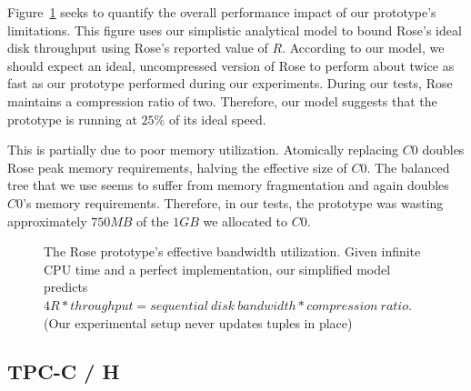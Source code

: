 \documentclass{vldb}
\newcommand{\rows}{Rose\xspace}
\newcommand{\rowss}{Rose's\xspace}
\begin{document}
Figure~\ref{fig:4R} seeks to quantify the overall performance
impact of our prototype's
limitations.  This figure uses our simplistic analytical model
to bound \rowss ideal disk throughput using \rowss
reported value of $R$.  According to our
model, we should expect an ideal, uncompressed version of \rows to
perform about twice as fast as our prototype performed during our experiments.  During our tests, \rows
maintains a compression ratio of two.  Therefore, our model suggests
that the prototype is running at $25\%$ of its ideal speed.


This is partially due to poor memory utilization.  Atomically
replacing $C0$ doubles \rows peak memory requirements, halving the
effective size of $C0$.  The balanced tree that we use seems to suffer
from memory fragmentation and again doubles $C0$'s memory
requirements.  Therefore, in our tests, the prototype was wasting
approximately $750MB$ of the $1GB$ we allocated to $C0$.

\begin{figure}
\centering
{}
\caption{The \rows prototype's effective bandwidth utilization.  Given
  infinite CPU time and a perfect implementation, our simplified model predicts $4R * throughput = sequential~disk~bandwidth *
  compression~ratio$.  (Our experimental setup never updates tuples in
  place)}
\label{fig:4R}
\end{figure}

\subsection{TPC-C / H}
\end{document}
